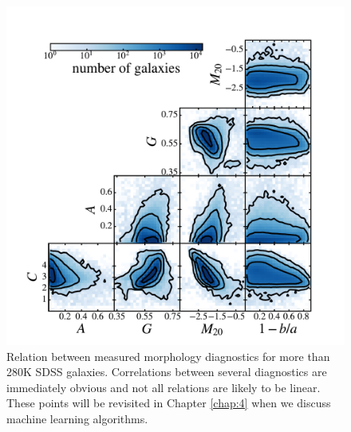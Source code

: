 \begin{figure}
\includegraphics[width=\textwidth]{Figures/human_machine/A2b.pdf}
\caption[Automated morphologies for the full GZ2 sample.]{Relation between measured morphology diagnostics for more than 280K SDSS galaxies. Correlations between several diagnostics are immediately obvious and not all relations are likely to be linear. These points will be revisited in Chapter \ref{chap:4} when we discuss machine learning algorithms.}
\label{fig: morphs}
\end{figure}